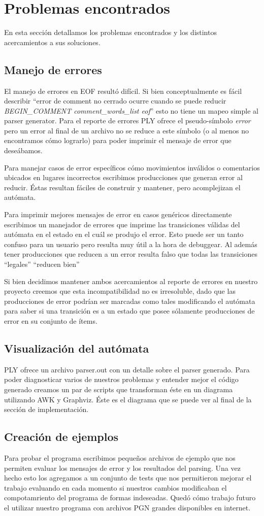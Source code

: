 \section{Problemas encontrados}
En esta sección detallamos los problemas encontrados y los distintos acercamientos a sus soluciones.

\subsection{Manejo de errores}
El manejo de errores en EOF resultó difícil. Si bien conceptualmente es fácil describir ``error de comment no cerrado ocurre cuando se puede reducir \textit{BEGIN\_COMMENT comment\_words\_list eof}'' esto no tiene un mapeo simple al parser generator. Para el reporte de errores PLY ofrece el pseudo-símbolo \textit{error} pero un error al final de un archivo no se reduce a este símbolo (o al menos no encontramos cómo lograrlo) para poder imprimir el mensaje de error que deseábamos.

Para manejar casos de error específicos cómo movimientos inválidos o comentarios ubicados en lugares incorrectos escribimos producciones que generan error al reducir. Éstas resultan fáciles de construir y mantener, pero acomplejizan el autómata.

Para imprimir mejores mensajes de error en casos genéricos directamente escribimos un manejador de errores que imprime las transiciones válidas del autómata en el estado en el cuál se produjo el error. Esto puede ser un tanto confuso para un usuario pero resulta muy útil a la hora de debuggear. Al además tener producciones que reducen a un error resulta falso que todas las transiciones ``legales'' ``reducen bien''

Si bien decidimos mantener ambos acercamientos al reporte de errores en nuestro proyecto creemos que esta incompatibilidad no es irresoluble, dado que las producciones de error podrían ser marcadas como tales modificando el autómata para saber si una transición es a un estado que posee sólamente producciones de error en su conjunto de ítems.

\subsection{Visualización del autómata}
PLY ofrece un archivo parser.out con un detalle sobre el parser generado. Para poder diagnosticar varios de nuestros problemas y entender mejor el código generado creamos un par de scripts que transforman éste en un diagrama utilizando AWK y Graphviz. Éste es el diagrama que se puede ver al final de la sección de implementación.

\subsection{Creación de ejemplos}
Para probar el programa escribimos pequeños archivos de ejemplo que nos permiten evaluar los mensajes de error y los resultados del parsing. Una vez hecho esto los agregamos a un conjunto de tests que nos permitieron mejorar el trabajo evaluando en cada momento si nuestros cambios modificaban el compotamriento del programa de formas indeseadas. Quedó cómo trabajo futuro el utilizar nuestro programa con archivos PGN grandes disponibles en internet.
